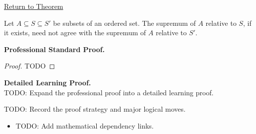 \newpage
{}
\label{prf:suprema-ambient-set}

\begin{remark*}[Return]
\hyperref[prop:suprema-ambient-set]{Return to Theorem}
\end{remark*}

\begin{theorem*}
Let $A\subseteq S\subseteq S'$ be subsets of an ordered set. The supremum of $A$ relative to $S$, if it exists, need not agree with the supremum of $A$ relative to $S'$.
\end{theorem*}

\textbf{Professional Standard Proof.}~\\
\begin{proof}
TODO
\end{proof}

\textbf{Detailed Learning Proof.}~\\
TODO: Expand the professional proof into a detailed learning proof.

\begin{remark*}
TODO: Record the proof strategy and major logical moves.
\end{remark*}

\begin{dependencies}
\begin{itemize}
  \item TODO: Add mathematical dependency links.
\end{itemize}
\end{dependencies}
